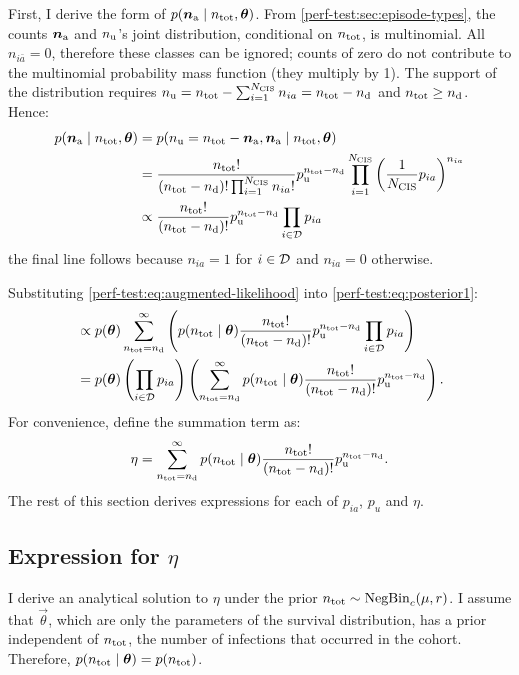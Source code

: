 \documentclass[thesis.tex]{subfiles}
\begin{document}
First, I derive the form of $p(\bm{n}_\text{a} \mid n_\text{tot}, \bm{\theta})$.
From \cref{perf-test:sec:episode-types}, the counts $\bm{n}_\text{a}$ and $n_\text{u}$'s joint distribution, conditional on $n_\text{tot}$, is multinomial.
All $n_{i\bar{a}} = 0$, therefore these classes can be ignored; counts of zero do not contribute to the multinomial probability mass function (they multiply by 1).
The support of the distribution requires $n_\text{u} = n_\text{tot} - \sum_{i=1}^{N_\text{CIS}} n_{ia} = n_\text{tot} - n_\text{d}$ and $n_\text{tot} \geq n_\text{d}$.
Hence:
\begin{align}
p(\bm{n}_\text{a} \mid n_\text{tot}, \bm{\theta})
&= p(n_\text{u}  = n_\text{tot} - \bm{n}_\text{a}, \bm{n}_\text{a}\mid n_\text{tot}, \bm{\theta}) \\
&= \frac{n_\text{tot}!}{(n_\text{tot} - n_\text{d})! \prod_{i=1}^{N_\text{CIS}} n_{ia}!}  p_\text{u}^{n_\text{tot} - n_\text{d}}\prod_{i=1}^{N_\text{CIS}} \left(\frac{1}{N_\text{CIS}}p_{ia}\right)^{n_{ia}} \\
&\propto \frac{n_\text{tot}!}{(n_\text{tot} - n_\text{d})!} p_\text{u}^{n_\text{tot} - n_\text{d}} \prod_{i \in \mathcal{D}} p_{ia} \label{perf-test:eq:augmented-likelihood}
\end{align}
the final line follows because $n_{ia} = 1$ for $i \in \mathcal{D}$ and $n_{ia} = 0$ otherwise.

Substituting \cref{perf-test:eq:augmented-likelihood} into \cref{perf-test:eq:posterior1}:
\begin{align}
&\propto p(\bm{\theta}) \sum_{n_\text{tot}=n_\text{d}}^\infty \left( p(n_\text{tot} \mid \bm{\theta}) \frac{n_\text{tot}!}{(n_\text{tot} - n_\text{d})!} p_\text{u}^{n_\text{tot} - n_\text{d}} \prod_{i \in \mathcal{D}} p_{ia} \right) \\
&= p(\bm{\theta}) \left( \prod_{i \in \mathcal{D}} p_{ia} \right) \left( \sum_{n_\text{tot}=n_\text{d}}^\infty p(n_\text{tot} \mid \bm{\theta}) \frac{n_\text{tot}!}{(n_\text{tot} - n_\text{d})!} p_\text{u}^{n_\text{tot} - n_\text{d}} \right) \label{perf-test:eq:posterior2}.
\end{align}
For convenience, define the summation term as:
\begin{align}
  \eta =  \sum_{n_\text{tot}=n_\text{d}}^\infty p(n_\text{tot} \mid \bm{\theta}) \frac{n_\text{tot}!}{(n_\text{tot} - n_\text{d})!} p_\text{u}^{n_\text{tot} - n_\text{d}}.
  \label{perf-test:eq:eta}
\end{align}
The rest of this section derives expressions for each of $p_{ia}$, $p_{u}$ and $\eta$.

\subsection{Expression for $\eta$}

I derive an analytical solution to $\eta$ under the prior $n_\text{tot} \sim \operatorname{NegBin}_{c}(\mu, r)$.
I assume that $\vec{\theta}$, which are only the parameters of the survival distribution, has a prior independent of $n_\text{tot}$, the number of infections that occurred in the cohort.
Therefore, $p(n_\text{tot} \mid \bm{\theta}) = p(n_\text{tot})$.
\end{document}
